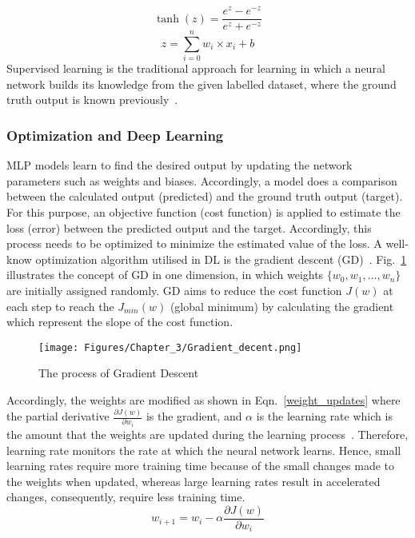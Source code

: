 \begin{equation}
	\tanh(z)=  \frac{e^z-e^{-z}}{e^z+e^{-z}}
	\label{tanh}
\end{equation}
\begin{equation}
	z= \sum_{i=0}^{n}  w_i\times x_i +b
	\label{z}
\end{equation}
Supervised learning is the traditional approach for learning in which a neural network builds its knowledge from the given labelled dataset, where the ground truth output is known previously~\cite{Lecun2015}.

\subsubsection{Optimization and Deep Learning}
MLP models learn to find the desired output by updating the network parameters such as weights and biases.
Accordingly, a model does a comparison between the calculated output (predicted) and the ground truth output (target).
For this purpose, an objective function (cost function) is applied to estimate the loss (error) between the predicted output and the target.
Accordingly, this process needs to be optimized to minimize the estimated value of the loss.
A well-know optimization algorithm utilised in DL is the gradient descent (GD)~\cite{Lecun2015}.
Fig.~\ref{fig:GD} illustrates the concept of GD in one dimension, in which weights \(\{w_0,w_1,...,w_n\}\) are initially assigned randomly.
GD aims to reduce the cost function \(J(w)\) at each step to reach the \(J_{min}(w)\) (global minimum) by calculating the gradient which represent the slope of the cost function.
\begin{figure}[!ht]
	\begin{center}
		\centering
		\texttt{[image: Figures/Chapter\_3/Gradient\_decent.png]}
	\end{center}
	\caption{The process of Gradient Descent} 
	\label{fig:GD}
\end{figure}
Accordingly, the weights are modified as shown in Eqn.~\ref{weight_updates} where the partial derivative \(\frac{\partial J(w)}{\partial w_i}\) is the gradient, and \(\alpha \) is the learning rate which is the amount that the weights are updated during the learning process~\cite{Russell2010}.
Therefore, learning rate monitors the rate at which the neural network learns.
Hence, small learning rates require more training time because of the small changes made to the weights when updated, whereas large learning rates result in accelerated changes, consequently, require less training time.
\begin{equation}
	w_{i+1}= w_{i} -\alpha \frac{\partial J(w)}{\partial w_i} 
	\label{weight_updates}
\end{equation}

